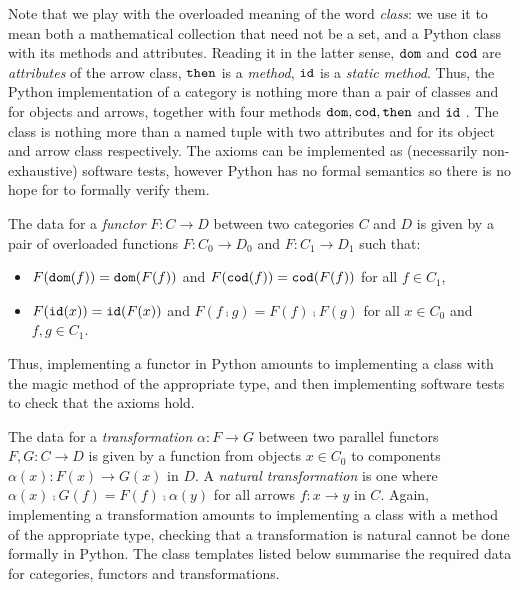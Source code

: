 Note that we play with the overloaded meaning of the word \emph{class}: we use it to mean both a mathematical collection that need not be a set, and a Python class with its methods and attributes.
Reading it in the latter sense, $\mathtt{dom}$ and $\mathtt{cod}$ are \emph{attributes} of the arrow class, $\mathtt{then}$ is a \emph{method}, $\mathtt{id}$ is a \emph{static method}.
Thus, the Python implementation of a category is nothing more than a pair of classes  and  for objects and arrows, together with four methods $\mathtt{dom}, \mathtt{cod}, \mathtt{then}$ and $\mathtt{id}$ .
The  class is nothing more than a named tuple with two attributes  and  for its object and arrow class respectively.
The axioms can be implemented as (necessarily non-exhaustive) software tests, however Python has no formal semantics so there is no hope for to formally verify them.

The data for a \emph{functor} $F : C \to D$ between two categories $C$ and $D$ is given by a pair of overloaded functions $F : C_0 \to D_0$ and $F : C_1 \to D_1$ such that:
\begin{itemize}
    \item $F(\mathtt{dom}(f)) = \mathtt{dom}(F(f))$ and $F(\mathtt{cod}(f)) = \mathtt{cod}(F(f))$ for all $f \in C_1$,
    \item $F(\mathtt{id}(x)) = \mathtt{id}(F(x))$ and $F(f \fcmp g) = F(f) \fcmp F(g)$ for all $x \in C_0$ and $f, g \in C_1$.
\end{itemize}
Thus, implementing a functor in Python amounts to implementing a class with the magic method  of the appropriate type, and then implementing software tests to check that the axioms hold.

The data for a \emph{transformation} $\alpha : F \to G$ between two parallel functors $F, G : C \to D$ is given by a function from objects $x \in C_0$ to components $\alpha(x) : F(x) \to G(x)$ in $D$.
A \emph{natural transformation} is one where $\alpha(x) \fcmp G(f) = F(f) \fcmp \alpha(y)$ for all arrows $f : x \to y$ in $C$.
Again, implementing a transformation amounts to implementing a class with a  method of the appropriate type, checking that a transformation is natural cannot be done formally in Python.
The class templates listed below summarise the required data for categories, functors and transformations.

